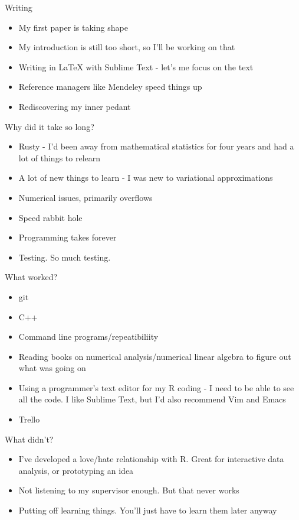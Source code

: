 \documentclass{beamer}
\begin{document}
\begin{frame}{Writing}
	\begin{itemize}
		\item My first paper is taking shape
		\item My introduction is still too short, so I'll be working on that
		\item Writing in LaTeX with Sublime Text - let's me focus on the text
		\item Reference managers like Mendeley speed things up
		\item Rediscovering my inner pedant
	\end{itemize}
\end{frame}

\begin{frame}{Why did it take so long?}
	\begin{itemize}
		\item Rusty - I'd been away from mathematical statistics for four years and had a lot of things to
					relearn
		\item A lot of new things to learn - I was new to variational approximations
		\item Numerical issues, primarily overflows
		\item Speed rabbit hole
		\item Programming takes forever
		\item Testing. So much testing.
	\end{itemize}
\end{frame}

\begin{frame}{What worked?}
	\begin{itemize}
		\item git
		\item C++
		\item Command line programs/repeatibiliity
		\item Reading books on numerical analysis/numerical linear algebra to figure out what was going on
		\item Using a programmer's text editor for my R coding - I need to be able to see all the code. I like
					Sublime Text, but I'd also recommend Vim and Emacs
		\item Trello
	\end{itemize}
\end{frame}

\begin{frame}{What didn't?}
	\begin{itemize}
		\item I've developed a love/hate relationship with R. Great for interactive data analysis, or
					prototyping an idea
		\item Not listening to my supervisor enough. But that never works
		\item Putting off learning things. You'll just have to learn them later anyway
	\end{itemize}
\end{frame}
\end{document}
